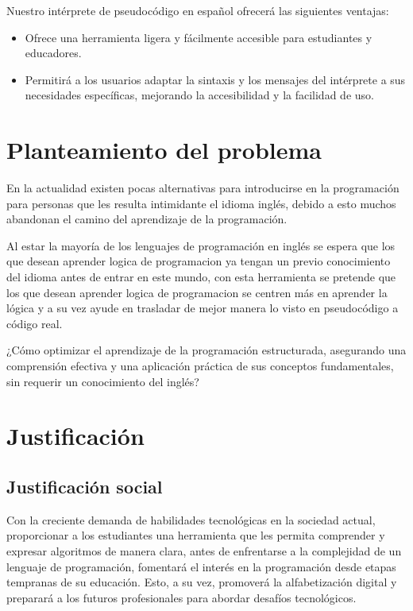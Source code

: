 Nuestro intérprete de pseudocódigo en español ofrecerá las siguientes ventajas:

\vspace{-1em}
\begin{itemize}
  \item Ofrece una herramienta ligera y fácilmente accesible para estudiantes y educadores.
  \item  Permitirá a los usuarios adaptar la sintaxis y los mensajes del intérprete a sus necesidades específicas, mejorando la accesibilidad y la facilidad de uso.
\end{itemize}

\section{Planteamiento del problema}
En la actualidad existen pocas alternativas para introducirse en la programación para personas que les resulta intimidante el idioma inglés, debido a esto muchos abandonan el camino del aprendizaje de la programación.

Al estar la mayoría de los lenguajes de programación en inglés se espera que los que desean aprender logica de programacion ya tengan un previo conocimiento del idioma antes de entrar en este mundo, con esta herramienta se pretende que los que desean aprender logica de programacion se centren más en aprender la lógica y a su vez ayude en trasladar de mejor manera lo visto en pseudocódigo a código real.

¿Cómo optimizar el aprendizaje de la programación estructurada, asegurando una comprensión efectiva y una aplicación práctica de sus conceptos fundamentales, sin requerir un conocimiento del inglés?

\section{Justificación}
\subsection{Justificación social}
Con la creciente demanda de habilidades tecnológicas en la sociedad actual, proporcionar a los estudiantes una herramienta que les permita comprender y expresar algoritmos de manera clara, antes de enfrentarse a la complejidad de un lenguaje de programación, fomentará el interés en la programación desde etapas tempranas de su educación. Esto, a su vez, promoverá la alfabetización digital y preparará a los futuros profesionales para abordar desafíos tecnológicos.

